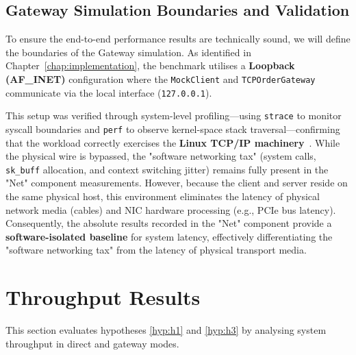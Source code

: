 \subsection{Gateway Simulation Boundaries and Validation}
To ensure the end-to-end performance results are technically sound, we 
will define the boundaries of the Gateway simulation. 
As identified in Chapter~\ref{chap:implementation}, the benchmark utilises a \textbf{Loopback (AF\_INET)} 
configuration where the \texttt{MockClient} and \texttt{TCPOrderGateway} 
communicate via the local interface (\texttt{127.0.0.1}). 

This setup was verified through system-level profiling—using \texttt{strace} 
to monitor syscall boundaries and \texttt{perf} to observe kernel-space stack 
traversal—confirming that the workload correctly exercises the 
\textbf{Linux TCP/IP machinery}~\citep{benvenuti_networking}. While 
the physical wire is bypassed, the "software networking tax" (system calls, 
\texttt{sk\_buff} allocation, and context switching jitter) remains fully 
present in the "Net" component measurements.
However, because the client and server reside on the same physical host, 
this environment eliminates the latency of physical network media (cables) 
and NIC hardware processing (e.g., PCIe bus latency). 
Consequently, the absolute results recorded in the "Net" component provide a 
\textbf{software-isolated baseline} for system latency, effectively 
differentiating the "software networking tax" from the latency of 
physical transport media.



\section{Throughput Results}
\label{sec:throughput_results}
This section evaluates hypotheses \ref{hyp:h1} and \ref{hyp:h3} by analysing system 
throughput in direct and gateway modes.

